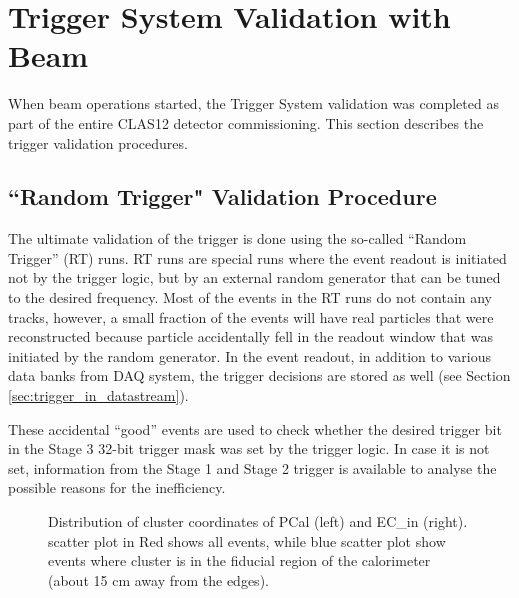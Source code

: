 \section{Trigger System Validation with Beam}
\label{sec:validation}

When beam operations started, the Trigger System validation was completed as part of the entire CLAS12 detector commissioning. This section describes the trigger validation procedures. 

\subsection{``Random Trigger" Validation Procedure}
\label{sec:validation_random}

The ultimate validation of the trigger is done using the so-called ``Random Trigger'' (RT) runs. RT runs are special runs where the event readout is initiated not by the trigger logic, but by an external random generator that can be tuned to the desired frequency. Most of the events in the RT runs do not contain any tracks, however, a small fraction of the events will have real particles that were reconstructed because particle accidentally fell in the readout window that was initiated by the random generator. In the event readout, in addition to various data banks from DAQ system, the trigger decisions are stored as well (see Section \ref{sec:trigger_in_datastream}).

These accidental ``good'' events are used to check whether the desired trigger bit in the Stage 3 32-bit trigger mask was set by the trigger logic. In case it is not set, information from the Stage 1 and Stage 2 trigger is available to analyse the possible reasons for the inefficiency.

\begin{figure}[!htb]
	\centering
	\caption{Distribution of cluster coordinates of PCal (left) and EC\_{in} (right).
		scatter plot in Red shows all events, while blue scatter plot show events where cluster
		is in the fiducial region of the calorimeter (about 15 cm away from the edges).}
\end{figure}

